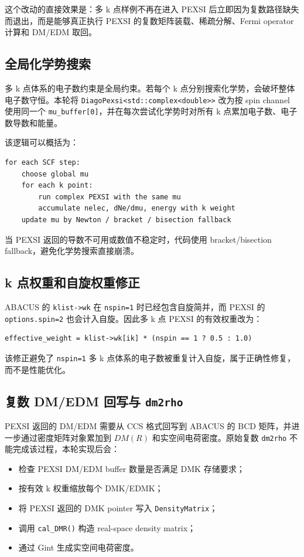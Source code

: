 \documentclass[a4paper,11pt]{article}
\newcommand{\code}[1]{\texttt{#1}}
\begin{document}
这个改动的直接效果是：多 k 点样例不再在进入 PEXSI 后立即因为复数路径缺失而退出，而是能够真正执行 PEXSI 的复数矩阵装载、稀疏分解、Fermi operator 计算和 DM/EDM 取回。

\subsection{全局化学势搜索}

多 k 点体系的电子数约束是全局约束。若每个 k 点分别搜索化学势，会破坏整体电子数守恒。本轮将 \code{DiagoPexsi<std::complex<double>>} 改为按 spin channel 使用同一个 \code{mu\_buffer[0]}，并在每次尝试化学势时对所有 k 点累加电子数、电子数导数和能量。

该逻辑可以概括为：

\begin{verbatim}
for each SCF step:
    choose global mu
    for each k point:
        run complex PEXSI with the same mu
        accumulate nelec, dNe/dmu, energy with k weight
    update mu by Newton / bracket / bisection fallback
\end{verbatim}

当 PEXSI 返回的导数不可用或数值不稳定时，代码使用 bracket/bisection fallback，避免化学势搜索直接崩溃。

\subsection{k 点权重和自旋权重修正}

ABACUS 的 \code{klist->wk} 在 \code{nspin=1} 时已经包含自旋简并，而 PEXSI 的 \code{options.spin=2} 也会计入自旋。因此多 k 点 PEXSI 的有效权重改为：

\begin{verbatim}
effective_weight = klist->wk[ik] * (nspin == 1 ? 0.5 : 1.0)
\end{verbatim}

该修正避免了 \code{nspin=1} 多 k 点体系的电子数被重复计入自旋，属于正确性修复，而不是性能优化。

\subsection{复数 DM/EDM 回写与 \code{dm2rho}}

PEXSI 返回的 DM/EDM 需要从 CCS 格式回写到 ABACUS 的 BCD 矩阵，并进一步通过密度矩阵对象累加到 \(DM(R)\) 和实空间电荷密度。原始复数 \code{dm2rho} 不能完成该过程，本轮实现后会：

\begin{itemize}
    \item 检查 PEXSI DM/EDM buffer 数量是否满足 DMK 存储要求；
    \item 按有效 k 权重缩放每个 DMK/EDMK；
    \item 将 PEXSI 返回的 DMK pointer 写入 \code{DensityMatrix}；
    \item 调用 \code{cal\_DMR()} 构造 real-space density matrix；
    \item 通过 Gint 生成实空间电荷密度。
\end{itemize}
\end{document}
